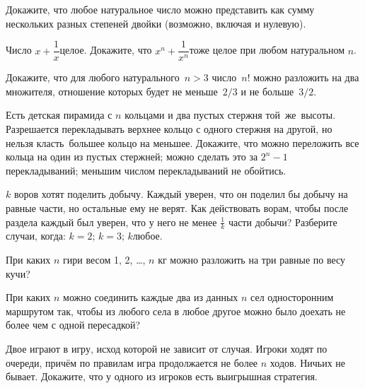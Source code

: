 \documentclass[a4paper,12pt]{article}
\begin{document}
Докажите, что любое натуральное число можно представить как сумму нескольких разных степеней двойки (возможно, включая и нулевую).

Число $x+\dfrac1x$\т целое. Докажите, что $x^n+\dfrac1{x^n}$\т тоже целое при любом натуральном $n$.

Докажите, что для любого натурального~$n>3$ число~$n!$ можно разложить на два множителя, отношение которых будет не меньше~$2/3$ и не больше~$3/2$.

Есть детская пирамида с $n$ кольцами и два пустых стержня той~же~высоты.
Разрешается перекладывать верхнее кольцо с одного стержня на другой, но нельзя класть~большее кольцо на меньшее. Докажите, что
 можно переложить все кольца на один из пустых стержней;
 можно сделать это за $2^n-1$ перекладываний;
 меньшим числом перекладываний не обойтись.

$k$ воров хотят поделить добычу. Каждый уверен, что он поделил бы добычу
на равные части, но остальные ему не верят.  Как действовать ворам, чтобы после раздела каждый был уверен, что у него не менее $\frac1k$ части добычи? Разберите случаи, когда:
$k=2$;
$k=3$;
$k$\т любое.

При каких $n$ гири весом 1, 2, \dots, $n$ кг можно разложить на три равные по весу кучи?

При каких $n$ можно соединить каждые два из данных $n$ сел односторонним маршрутом так, чтобы из любого села в любое другое можно было доехать не более чем с одной пересадкой?

Двое играют в игру, исход которой не зависит от случая. Игроки ходят по очереди, причём по правилам игра продолжается не более $n$ ходов. Ничьих не бывает. Докажите, что у одного из игроков есть выигрышная стратегия.

\vfill
{}
\end{document}
